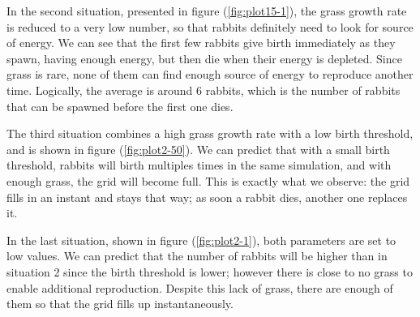 \documentclass[11pt]{article}
\begin{document}
In the second situation, presented in figure (\ref{fig:plot15-1}), the grass growth rate is reduced to a very low number, so that rabbits definitely need to look for source of energy. 
We can see that the first few rabbits give birth immediately as they spawn, having enough energy, but then die when their energy is depleted. Since grass is rare, none of them can find enough source of energy to reproduce another time. Logically, the average is around 6 rabbits, which is the number of rabbits that can be spawned before the first one dies.

The third situation combines a high grass growth rate with a low birth threshold, and is shown in figure (\ref{fig:plot2-50}). We can predict that with a small birth threshold, rabbits will birth multiples times in the same simulation, and with enough grass, the grid will become full. This is exactly what we observe: the grid fills in an instant and stays that way; as soon a rabbit dies, another one replaces it.

In the last situation, shown in figure (\ref{fig:plot2-1}), both parameters are set to low values. We can predict that the number of rabbits will be higher than in situation 2 since the birth threshold is lower; however there is close to no grass to enable additional reproduction.
Despite this lack of grass, there are enough of them so that the grid fills up instantaneously. 
\end{document}

